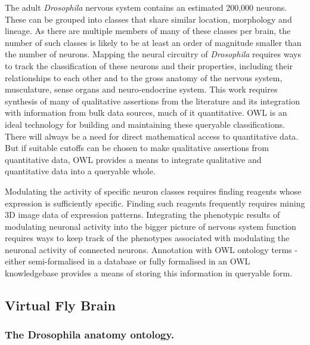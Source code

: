\documentclass[runningheads,a4paper]{llncs}
\begin{document}
The adult \textit{Drosophila} nervous system contains an estimated
200,000 neurons.  These can be grouped into classes that share
similar location, morphology and lineage.  As there are multiple
members of many of these classes per brain, the number of such classes
is likely to be at least an order of magnitude smaller than the number
of neurons.  Mapping the neural circuitry of \textit{Drosophila}
requires ways to track the classification of these neurons and their
properties, including their relationships to each other and to the
gross anatomy of the nervous system, musculature, sense organs and
neuro-endocrine system.  This work requires synthesis of many of
qualitative assertions from the literature and its integration with
information from bulk data sources, much of it quantitative.  OWL
is an ideal technology for building and maintaining these queryable
classifications. There will always be a need for direct mathematical
access to quantitative data.  But if suitable cutoffs can be
chosen to make qualitative assertions from quantitative data, OWL
provides a means to integrate qualitative and quantitative data into a
queryable whole.

Modulating the activity of specific neuron classes requires finding
reagents whose expression is sufficiently specific. Finding such reagents
frequently requires mining 3D image data of expression patterns.
Integrating the phenotypic results of modulating neuronal activity
into the bigger picture of nervous system function requires ways to
keep track of the phenotypes associated with modulating the neuronal
activity of connected neurons.  Annotation with OWL ontology terms -
either semi-formalised in a database or fully formalised in an OWL
knowledgebase provides a means of storing this information in
queryable form.

\subsection{Virtual Fly Brain}

\subsubsection{The Drosophila anatomy ontology.}
\end{document}
